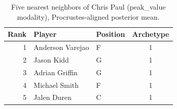 \begin{table}[htbp]
  \centering\small
  \begin{tabular}{rllc}
    \toprule
    Rank & Player & Position & Archetype \\
    \midrule
    1 & Anderson Varejao & F & 1 \\
    2 & Jason Kidd & G & 1 \\
    3 & Adrian Griffin & G & 1 \\
    4 & Michael Smith & F & 1 \\
    5 & Jalen Duren & C & 1 \\
    \bottomrule
  \end{tabular}
  \caption{Five nearest neighbors of Chris Paul (peak_value modality), Procrustes-aligned posterior mean.}
  \label{tab:Chris_Paul_neighbors_peak_value}
\end{table}

